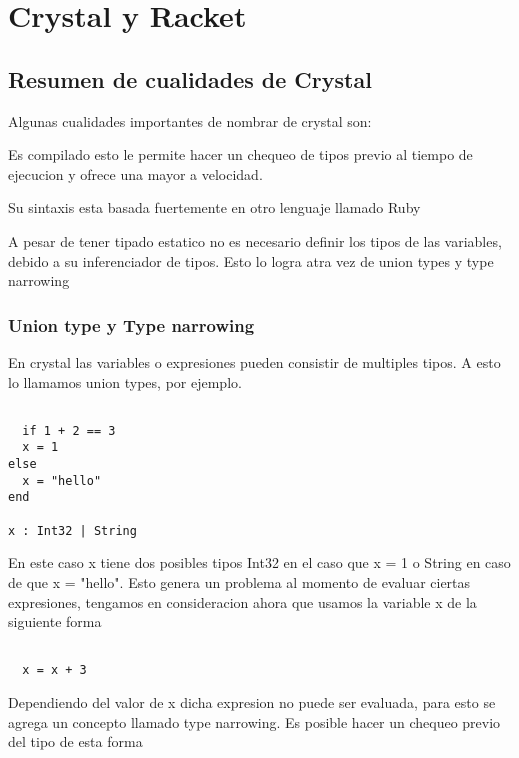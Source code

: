 \setchapterpreamble[u]{\margintoc}
\chapter{Crystal y Racket}

\section{Resumen de cualidades de Crystal}

Algunas cualidades importantes de nombrar  de crystal son: 

Es compilado esto le permite hacer un chequeo de tipos previo al tiempo de ejecucion y ofrece una mayor a velocidad.

Su sintaxis esta basada fuertemente en otro lenguaje llamado Ruby

A pesar de tener tipado estatico no es necesario definir los tipos de las variables, debido a su inferenciador de tipos. Esto lo logra atra vez de union types y type narrowing

\subsection[]{Union type y Type narrowing}

 En crystal las variables o expresiones pueden consistir de multiples tipos. A esto lo llamamos union types, por ejemplo.

\begin{verbatim}

  if 1 + 2 == 3
  x = 1
else
  x = "hello"
end

x : Int32 | String

\end{verbatim}

En este caso x tiene dos posibles tipos Int32 en el caso que x = 1 o String en caso de que x = "hello".
 Esto genera un problema al momento de evaluar ciertas expresiones, tengamos  en consideracion ahora que usamos la variable x de la siguiente forma

 \begin{verbatim}

  x = x + 3

\end{verbatim}

Dependiendo del valor de x dicha expresion no puede ser evaluada, para esto se agrega un concepto llamado type narrowing. Es posible hacer un chequeo previo del tipo de esta forma


